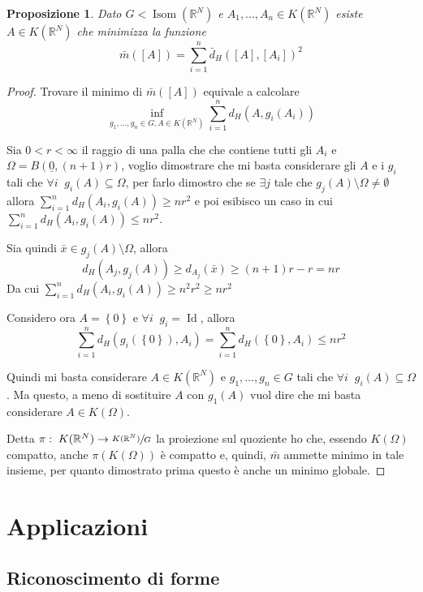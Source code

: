 \documentclass[a4paper,10pt]{article}
\newcounter{counter1}
\theoremstyle{plain}
\newtheorem{mypro}[counter1]{Proposizione}
\theoremstyle{definition}
\theoremstyle{remark}
\newcommand{\ubar}[1]{\underline{#1}}
\newcommand{\set}[1]{\left\{#1\right\}}
\newcommand{\pa}[1]{\left(#1\right)}
\newcommand{\bra}[1]{\left[#1\right]}
\DeclareMathOperator{\id}{Id}
\DeclareMathOperator{\isom}{Isom}
\begin{document}
\begin{mypro}
  Dato $G < \isom (\mathbb{R}^N)$ e $A_1,...,A_n \in K(\mathbb{R}^N)$
  esiste $A \in K(\mathbb{R}^N)$ che minimizza la funzione 
  \[ \bar m(\bra{A}) = \sum _{i =1} ^n \bar
  d_H(\bra{A},\bra{A_i})^2 \]
\end{mypro}
\begin{proof}
  Trovare il minimo di $\bar m(\bra{A})$ equivale a calcolare
  \[ \inf _{g_1,...,g_n \in G, A\in K(\mathbb{R}^N)} \sum _{ i = 1} ^n
  d_H(A,g_i(A_i)) \]

  Sia $0 < r< \infty$ il raggio di una palla che che contiene tutti
  gli $A_i$ e $\Omega = B(\ubar{0},(n+1)r)$, voglio dimostrare che mi
  basta considerare gli $A$ e i $g_i$ tali che $\forall i\;\; g_i(A)
  \subseteq \Omega$, per farlo dimostro che se $\exists j$ tale che
  $g_j(A) \setminus \Omega \neq \emptyset$ allora $\sum _{ i = 1} ^n
  d_H(A_i,g_i(A)) \ge nr^2$ e poi esibisco un caso in cui $\sum _{ i =
    1} ^n d_H(A_i,g_i(A)) \le nr^2$.

  Sia quindi $\bar x \in g_j(A) \setminus \Omega$, allora
  \[ d_H(A_j,g_j(A)) \ge d_{A_j}(\bar x) \ge (n+1)r - r = nr \]
  Da cui $\sum _{ i = 1} ^n d_H(A_i,g_i(A)) \ge n^2r^2 \ge nr^2$
  
  Considero ora $A = \set{0}$ e $\forall i\;\; g_i = \id$, allora
  \[ \sum _{ i = 1} ^n d_H(g_i(\set{0}), A_i) = \sum _{ i = 1} ^n
  d_H(\set{0}, A_i) \le nr^2 \]

  Quindi mi basta considerare $A\in K(\mathbb{R}^N)$ e $g_1,...,g_n
  \in G$ tali che $\forall i\;\; g_i(A) \subseteq \Omega$. Ma questo,
  a meno di sostituire $A$ con $g_1(A)$ vuol dire che mi basta
  considerare $A \in K(\Omega)$.

  Detta $\pi:\; K(\mathbb{R}^N) \to \sfrac{K(\mathbb{R}^N)}{G}$ la
  proiezione sul quoziente ho che, essendo $K(\Omega)$ compatto, anche
  $\pi\pa{K(\Omega)}$ è compatto e, quindi, $\bar m$ ammette minimo in
  tale insieme, per quanto dimostrato prima questo è anche un minimo
  globale.
\end{proof}


\section{Applicazioni}

\subsection{Riconoscimento di forme}
\end{document}
